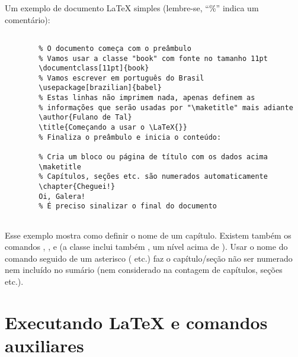 Um exemplo de documento \LaTeX{} simples (lembre-se, ``\%'' indica um comentário):

\begin{verbatim}

        % O documento começa com o preâmbulo
        % Vamos usar a classe "book" com fonte no tamanho 11pt
        \documentclass[11pt]{book}
        % Vamos escrever em português do Brasil
        \usepackage[brazilian]{babel}
        % Estas linhas não imprimem nada, apenas definem as
        % informações que serão usadas por "\maketitle" mais adiante
        \author{Fulano de Tal}
        \title{Começando a usar o \LaTeX{}}
        % Finaliza o preâmbulo e inicia o conteúdo:
        
        % Cria um bloco ou página de título com os dados acima
        \maketitle
        % Capítulos, seções etc. são numerados automaticamente
        \chapter{Cheguei!}
        Oi, Galera!
        % É preciso sinalizar o final do documento
        

\end{verbatim}

Esse exemplo mostra como definir o nome de um capítulo. Existem também os
comandos , ,  e
 (a classe  inclui também , um nível
acima de ). Usar o nome do comando seguido de um asterisco
( etc.) faz o capítulo/seção não ser numerado nem incluído
no sumário (nem considerado na contagem de capítulos, seções etc.).

\section{Executando \LaTeX{} e comandos auxiliares}
\label{sec:make}

